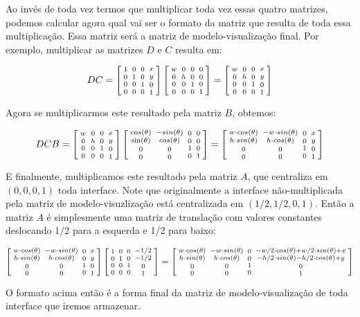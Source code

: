 Ao invés de toda vez termos que multiplicar toda vez essas quatro
matrizes, podemos calcular agora qual vai ser o formato da matriz que
resulta de toda essa multiplicação. Essa matriz será a matriz de
modelo-visualização final. Por exemplo, multiplicar as matrizes $D$ e
$C$ resulta em:

$$ DC=\left[{{1 \atop 0}\atop {0\atop 0}}{{0 \atop 1}\atop {0 \atop
      0}}{{0\atop 0}\atop{1 \atop 0}}{{x \atop y}\atop{0\atop
      1}}\right]\left[{{w
      \atop 0}\atop {0\atop 0}}{{0 \atop h}\atop {0 \atop 0}}{{0\atop
      0}\atop{1 \atop 0}}{{0 \atop 0}\atop{0\atop 1}}\right]=
\left[{{w \atop 0}\atop {0\atop 0}}
  {{0 \atop h}\atop {0 \atop 0}}
  {{0\atop 0}\atop{1 \atop 0}}
  {{x \atop y}\atop{0\atop 1}}\right]
$$

Agora se multiplicarmos este resultado pela matriz $B$, obtemos:

$$ DCB = \left[{{w \atop 0}\atop {0\atop 0}} {{0 \atop h}\atop
  {0 \atop 0}} {{0\atop 0}\atop{1 \atop 0}} {{x \atop y}\atop{0\atop
  1}}\right]\left[{{cos(\theta) \atop \sin(\theta)}\atop {0\atop
  0}}{{-sin(\theta) \atop cos(\theta)}\atop {0 \atop 0}}{{0\atop
  0}\atop{1 \atop 0}}{{0 \atop 0}\atop{0\atop 1}}\right]=
\left[{{w\cdot cos(\theta) \atop h\cdot sin(\theta)}\atop {0\atop 0}}
  {{-w\cdot sin(\theta) \atop h\cdot cos(\theta)}\atop {0 \atop 0}}
  {{0\atop 0}\atop{1 \atop 0}}
  {{x \atop y}\atop{0\atop 1}}\right]
$$

E finalmente, multiplicamos este resultado pela matriz $A$, que
centraliza em $(0, 0, 0, 1)$ toda interface. Note que originalmente
a interface não-multiplicada pela matriz de modelo-visuzlização está
centralizada em $(1/2, 1/2, 0, 1)$. Então a matriz $A$ é simplesmente
uma matriz de translação com valores constantes deslocando 1/2 para a
esquerda e 1/2 para baixo:

$$
\left[{{w\cdot cos(\theta) \atop h\cdot sin(\theta)}\atop {0\atop 0}}
  {{-w\cdot sin(\theta) \atop h\cdot cos(\theta)}\atop {0 \atop 0}}
  {{0\atop 0}\atop{1 \atop 0}}
  {{x \atop y}\atop{0\atop 1}}\right]
\left[{{1 \atop 0}\atop {0\atop 0}}{{0 \atop 1}\atop {0 \atop
      0}}{{0\atop 0}\atop{1 \atop 0}}{{-1/2 \atop -1/2}\atop{0\atop
      1}}\right]=
\left[{{w\cdot cos(\theta) \atop h\cdot sin(\theta)}\atop {0\atop 0}}
  {{-w\cdot sin(\theta) \atop h\cdot cos(\theta)}\atop {0 \atop 0}}
  {{0\atop 0}\atop{1 \atop 0}} {{-w/2\cdot cos(\theta) + w/2\cdot
  sin(\theta)+x \atop -h/2\cdot sin(\theta)-h/2\cdot
  cos(\theta)+y}\atop{0\atop 1}}\right]
$$

O formato acima então é a forma final da matriz de modelo-visualização
de toda interface que iremos armazenar.

